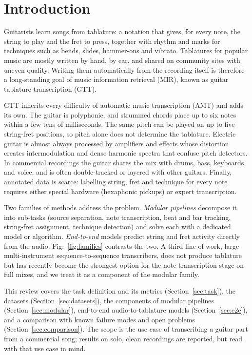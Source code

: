 \section{Introduction}
\label{sec:intro}

Guitarists learn songs from tablature: a notation that gives, for every note,
the string to play and the fret to press, together with rhythm and marks for
techniques such as bends, slides, hammer-ons and vibrato. Tablatures for
popular music are mostly written by hand, by ear, and shared on community
sites with uneven quality. Writing them automatically from the recording
itself is therefore a long-standing goal of music information retrieval (MIR),
known as guitar tablature transcription (GTT).

GTT inherits every difficulty of automatic music transcription (AMT) and adds
its own. The guitar is polyphonic, and strummed chords place up to six notes
within a few tens of milliseconds. The same pitch can be played on up to five
string-fret positions, so pitch alone does not determine the tablature.
Electric guitar is almost always processed by amplifiers and effects whose
distortion creates intermodulation and dense harmonic spectra that confuse
pitch detectors. In commercial recordings the guitar shares the mix with
drums, bass, keyboards and voice, and is often double-tracked or layered with
other guitars. Finally, annotated data is scarce: labelling string, fret and
technique for every note requires either special hardware (hexaphonic pickups)
or expert transcription.

Two families of methods address the problem. \emph{Modular pipelines}
decompose it into sub-tasks (source separation, note transcription, beat and
bar tracking, string-fret assignment, technique detection) and solve each with
a dedicated model or algorithm. \emph{End-to-end} models predict string and
fret activity directly from the audio. Fig.~\ref{fig:families} contrasts the
two. A third line of work, large multi-instrument sequence-to-sequence
transcribers, does not produce tablature but has recently become the strongest
option for the note-transcription stage on full mixes, and we treat it as a
component of the modular family.

This review covers the task definition and its metrics
(Section~\ref{sec:task}), the datasets (Section~\ref{sec:datasets}), the
components of modular pipelines (Section~\ref{sec:modular}), end-to-end
audio-to-tablature models (Section~\ref{sec:e2e}), and a comparison with known
failure modes and open problems (Section~\ref{sec:comparison}). The scope is
the use case of transcribing a guitar part from a commercial song; results on
solo, clean recordings are reported, but read with that use case in mind.

